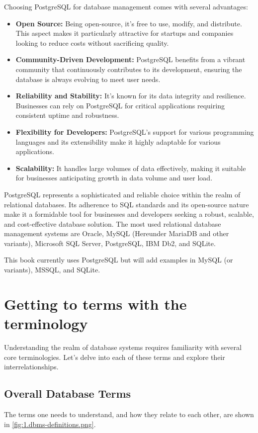 Choosing PostgreSQL for database management comes with several advantages:

\begin{itemize}
    \item \textbf{Open Source:} Being open-source, it's free to use, modify, and distribute. This aspect makes it particularly attractive for startups and companies looking to reduce costs without sacrificing quality.
    \item \textbf{Community-Driven Development:} PostgreSQL benefits from a vibrant community that continuously contributes to its development, ensuring the database is always evolving to meet user needs.
    \item \textbf{Reliability and Stability:} It's known for its data integrity and resilience. Businesses can rely on PostgreSQL for critical applications requiring consistent uptime and robustness.
    \item \textbf{Flexibility for Developers:} PostgreSQL's support for various programming languages and its extensibility make it highly adaptable for various applications.
    \item \textbf{Scalability:} It handles large volumes of data effectively, making it suitable for businesses anticipating growth in data volume and user load.
\end{itemize}

PostgreSQL represents a sophisticated and reliable choice within the realm of relational databases. Its adherence to SQL standards and its open-source nature make it a formidable tool for businesses and developers seeking a robust, scalable, and cost-effective database solution. The most used relational database management systems are Oracle, MySQL (Hereunder MariaDB and other variants), Microsoft SQL Server, PostgreSQL, IBM Db2, and SQLite.

This book currently uses PostgreSQL but will add examples in MySQL (or variants), MSSQL, and SQLite.


\section{Getting to terms with the terminology}
Understanding the realm of database systems requires familiarity with several core terminologies. Let's delve into each of these terms and explore their interrelationships.

\subsection{Overall Database Terms}
The terms one needs to understand, and how they relate to each other, are shown in \cref{fig:1.dbms-definitions.png}.


